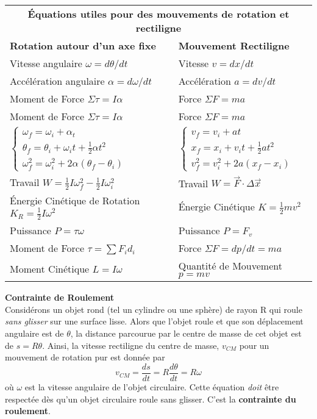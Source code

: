 \documentclass[titlepage,oneside,a4paper,11pt]{book} %
\begin{document}
\begin{table}[]
\centering
\begin{tabular}{ll}
\multicolumn{2}{c}{\cellcolor[HTML]{C0C0C0}{\color[HTML]{3166FF} }\textbf{Équations utiles pour des mouvements de rotation et rectiligne}} \\
 \textbf{Rotation autour d'un axe fixe} & \textbf{Mouvement Rectiligne}  \\ \hline
 Vitesse angulaire $\omega=d \theta / d t$& Vitesse $v=d x / d t$\\
Accélération angulaire $\alpha=d \omega / d t$&Accélération $a=d v / d t$\\
Moment de Force $\Sigma \tau=I \alpha$&  Force $\Sigma F=m a$\\
Moment de Force $\Sigma \tau=I \alpha$&  Force $\Sigma F=m a$\\
$\left\{\begin{array}{l}
\omega_{f}=\omega_{i}+\alpha_{t} \\
\theta_{f}=\theta_{i}+\omega_{i} t+\frac{1}{2} \alpha t^{2} \\
\omega_{f}^{2}=\omega_{i}^{2}+2 \alpha\left(\theta_{f}-\theta_{i}\right)
\end{array}\right.$&  $\left\{\begin{array}{l}
v_{f}=v_{i}+a t \\
x_{f}=x_{i}+v_{i} t+\frac{1}{2} a t^{2} \\
v_{f}^{2}=v_{i}^{2}+2 a\left(x_{f}-x_{i}\right)
\end{array}\right.$\\
Travail $W=\frac{1}{2} I \omega_{f}^{2}-\frac{1}{2} I \omega_{i}^{2}$&  Travail $W=\vec{F}\cdot \Delta\vec{x}$\\
Énergie Cinétique de Rotation $K_{R}=\frac{1}{2} I \omega^{2} \quad$& Énergie Cinétique $K=\frac{1}{2} m v^{2}$\\
Puissance $P=\tau \omega$& Puissance $P=F_{v}$\\
Moment de Force $\tau=\sum F_id_i$& Force $\Sigma F=d p / d t = ma$\\
Moment Cinétique  $L=I \omega$ & Quantité de Mouvement $p=m v$\\
\end{tabular}
\end{table}
\clearpage
\newpage
{\large \textbf{Contrainte de Roulement}}\\



Considérons un objet rond (tel un cylindre ou une sphère) de rayon R qui roule \emph{sans glisser} sur une surface lisse. Alors que l'objet roule et que son déplacement angulaire est de $\theta$, la distance parcourue par le centre de masse de cet objet est de $s=R\theta$. Ainsi, la vitesse rectiligne du centre de masse, $v_{CM}$ pour un mouvement de rotation pur est donnée par
\begin{equation}
v_{CM}=\frac{d s}{d t}=R \frac{d \theta}{d t}=R \omega
\end{equation}
où $\omega$ est la vitesse angulaire de l'objet circulaire.  Cette équation \emph{doit} être respectée dès qu'un objet circulaire roule sans glisser. C'est la \textbf{contrainte du roulement}.\\
\end{document}
